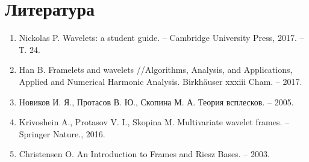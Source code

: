 \documentclass[a4paper,article,14pt]{extarticle}
\begin{document}
\pagebreak
\section{Литература}
\begin{enumerate}
\item{Nickolas P. Wavelets: a student guide. – Cambridge University Press, 2017. – Т. 24.}
\item{Han B. Framelets and wavelets //Algorithms, Analysis, and Applications, Applied and Numerical Harmonic Analysis. Birkhäuser xxxiii Cham. – 2017.}
\item{Новиков И. Я., Протасов В. Ю., Скопина М. А. Теория всплесков. – 2005.}
\item{Krivoshein A., Protasov V. I., Skopina M. Multivariate wavelet frames. – Springer Nature., 2016.}
\item{Christensen O. An Introduction to Frames and Riesz Bases. – 2003.}
\end{enumerate}
\end{document}

